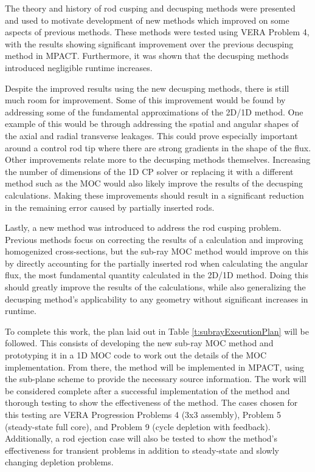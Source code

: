 The theory and history of rod cusping and decusping methods were presented and used to motivate development of new methods which improved on some aspects of previous methods.  These methods were tested using VERA Problem 4, with the results showing significant improvement over the previous decusping method in MPACT.  Furthermore, it was shown that the decusping methods introduced negligible runtime increases.

Despite the improved results using the new decusping methods, there is still much room for improvement.  Some of this improvement would be found by addressing some of the fundamental approximations of the 2D/1D method.  One example of this would be through addressing the spatial and angular shapes of the axial and radial transverse leakages.  This could prove especially important around a control rod tip where there are strong gradients in the shape of the flux.  Other improvements relate more to the decusping methods themselves.  Increasing the number of dimensions of the 1D CP solver or replacing it with a different method such as the MOC would also likely improve the results of the decusping calculations.  Making these improvements should result in a significant reduction in the remaining error caused by partially inserted rods.

Lastly, a new method was introduced to address the rod cusping problem.  Previous methods focus on correcting the results of a calculation and improving homogenized cross-sections, but the sub-ray MOC method would improve on this by directly accounting for the partially inserted rod when calculating the angular flux, the most fundamental quantity calculated in the 2D/1D method.  Doing this should greatly improve the results of the calculations, while also generalizing the decusping method's applicability to any geometry without significant increases in runtime.

To complete this work, the plan laid out in Table \ref{t:subrayExecutionPlan} will be followed.  This consists of developing the new sub-ray MOC method and prototyping it in a 1D MOC code to work out the details of the MOC implementation.  From there, the method will be implemented in MPACT, using the sub-plane scheme to provide the necessary source information.  The work will be considered complete after a successful implementation of the method and thorough testing to show the effectiveness of the method.  The cases chosen for this testing are VERA Progression Problems 4 (3x3 assembly), Problem 5 (steady-state full core), and Problem 9 (cycle depletion with feedback).  Additionally, a rod ejection case will also be tested to show the method's effectiveness for transient problems in addition to steady-state and slowly changing depletion problems.